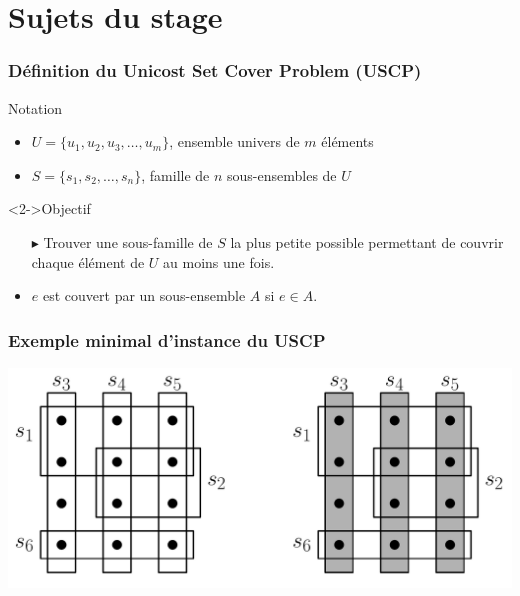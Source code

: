 \documentclass[11pt]{beamer}
\begin{document}
	\section{Sujets du stage}
		\begin{frame}
			\frametitle{Définition du Unicost Set Cover Problem (USCP)}
			\begin{block}{Notation}
				\begin{itemize}
					\item \(U = \{u_1, u_2, u_3, \dots, u_m\}\), ensemble univers de \(m\) éléments
					\item \(S = \{s_1, s_2, \dots, s_n\}\), famille de \(n\) sous-ensembles de \(U\)
				\end{itemize}
			\end{block}
			\begin{block}<2->{Objectif}
				\begin{itemize}
					\item[\alert{\(\blacktriangleright\)}] Trouver une sous-famille de \(S\) la plus petite possible permettant de couvrir chaque élément de \(U\) au moins une fois.
					\item \(e\) est couvert par un sous-ensemble \(A\) si \(e \in A\).
				\end{itemize}
			\end{block}
		\end{frame}
		\begin{frame}
			\frametitle{Exemple minimal d'instance du USCP}
			\centering%
			\includegraphics[width=0.85\linewidth]{uscp_example}%
		\end{frame}
\end{document}
